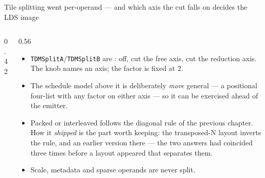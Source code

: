 \begin{frame}{Tile splitting went per-operand --- and which axis the cut falls on decides the LDS image}
\begin{columns}[T]
\begin{column}{0.42\textwidth}
\begin{center}
\end{center}
\end{column}
\begin{column}{0.56\textwidth}
\begin{itemize}
\item \texttt{TDMSplitA}/\texttt{TDMSplitB} are : off, cut the free
      axis, cut the reduction axis. The knob names an axis; the factor is fixed at 2.
\item The schedule model above it is deliberately \emph{more} general --- a positional four-list
      with any factor on either axis --- so it can be exercised ahead of the emitter.
\item Packed or interleaved follows the diagonal rule of the previous chapter. How it \emph{shipped}
      is the part worth keeping: the transposed-N layout inverts the rule, and an earlier version
       there --- the two answers had coincided three times before a layout
      appeared that separates them.
\item Scale, metadata and sparse operands are never split.
\end{itemize}
\end{column}
\end{columns}
\end{frame}
